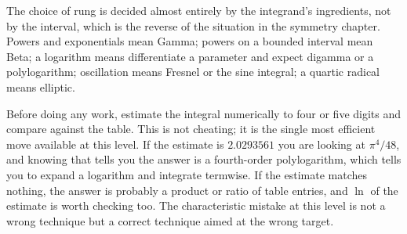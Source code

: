 The choice of rung is decided almost entirely by the integrand's ingredients, not by the interval, which is the reverse of the situation in the symmetry chapter. Powers and exponentials mean Gamma; powers on a bounded interval mean Beta; a logarithm means differentiate a parameter and expect digamma or a polylogarithm; oscillation means Fresnel or the sine integral; a quartic radical means elliptic.

\begin{center}
\end{center}

\begin{keynote}
Before doing any work, estimate the integral numerically to four or five digits and compare against the table. This is not cheating; it is the single most efficient move available at this level. If the estimate is $2.0293561$ you are looking at $\pi^{4}/48$, and knowing that tells you the answer is a fourth-order polylogarithm, which tells you to expand a logarithm and integrate termwise. If the estimate matches nothing, the answer is probably a product or ratio of table entries, and $\ln$ of the estimate is worth checking too. The characteristic mistake at this level is not a wrong technique but a correct technique aimed at the wrong target.
\end{keynote}

